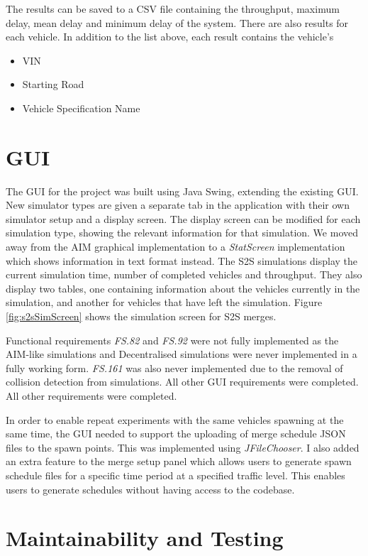 The results can be saved to a CSV file containing the throughput, maximum delay, mean delay and minimum delay of the system. There are also results for each vehicle. In addition to the list above, each result contains the vehicle's

\begin{itemize}
\item VIN
\item Starting Road
\item Vehicle Specification Name
\end{itemize}

\section{GUI}
\label{sec:GUI}
The GUI for the project was built using Java Swing, extending the existing GUI. New simulator types are given a separate tab in the application with their own simulator setup and a display screen. The display screen can be modified for each simulation type, showing the relevant information for that simulation. We moved away from the AIM graphical implementation to a \emph{StatScreen} implementation which shows information in text format instead. The S2S simulations display the current simulation time, number of completed vehicles and throughput. They also display two tables, one containing information about the vehicles currently in the simulation, and another for vehicles that have left the simulation. Figure \ref{fig:s2sSimScreen} shows the simulation screen for S2S merges.

Functional requirements \emph{FS.82} and \emph{FS.92} were not fully implemented as the AIM-like simulations and Decentralised simulations were never implemented in a fully working form. \emph{FS.161} was also never implemented due to the removal of collision detection from simulations. All other GUI requirements were completed. All other requirements were completed.

In order to enable repeat experiments with the same vehicles spawning at the same time, the GUI needed to support the uploading of merge schedule JSON files to the spawn points. This was implemented using \emph{JFileChooser}. I also added an extra feature to the merge setup panel which allows users to generate spawn schedule files for a specific time period at a specified traffic level. This enables users to generate schedules without having access to the codebase.

\section{Maintainability and Testing}
\label{sec:Testing}

